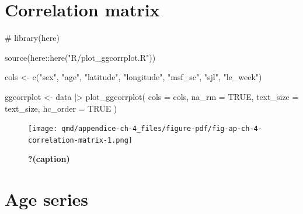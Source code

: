 \documentclass[
  12pt,
  a4paper,
  oneside]{tesesusp}
\newenvironment{Shaded}{\begin{snugshade}}{\end{snugshade}}
\newcommand{\AttributeTok}[1]{\textcolor[rgb]{0.40,0.45,0.13}{#1}}
\newcommand{\CommentTok}[1]{\textcolor[rgb]{0.37,0.37,0.37}{#1}}
\newcommand{\ConstantTok}[1]{\textcolor[rgb]{0.56,0.35,0.01}{#1}}
\newcommand{\FunctionTok}[1]{\textcolor[rgb]{0.28,0.35,0.67}{#1}}
\newcommand{\NormalTok}[1]{\textcolor[rgb]{0.00,0.23,0.31}{#1}}
\newcommand{\OtherTok}[1]{\textcolor[rgb]{0.00,0.23,0.31}{#1}}
\newcommand{\SpecialCharTok}[1]{\textcolor[rgb]{0.37,0.37,0.37}{#1}}
\newcommand{\StringTok}[1]{\textcolor[rgb]{0.13,0.47,0.30}{#1}}
\begin{document}
\hypertarget{correlation-matrix}{%
\section{Correlation matrix}\label{correlation-matrix}}

\begin{Shaded}
\begin{Highlighting}[numbers=left,,]
\CommentTok{\# library(here)}

\FunctionTok{source}\NormalTok{(here}\SpecialCharTok{::}\FunctionTok{here}\NormalTok{(}\StringTok{"R/plot\_ggcorrplot.R"}\NormalTok{))}

\NormalTok{cols }\OtherTok{\textless{}{-}} \FunctionTok{c}\NormalTok{(}\StringTok{"sex"}\NormalTok{, }\StringTok{"age"}\NormalTok{, }\StringTok{"latitude"}\NormalTok{, }\StringTok{"longitude"}\NormalTok{, }\StringTok{"msf\_sc"}\NormalTok{, }\StringTok{"sjl"}\NormalTok{, }\StringTok{"le\_week"}\NormalTok{)}

\NormalTok{ggcorrplot }\OtherTok{\textless{}{-}}
\NormalTok{  data }\SpecialCharTok{|\textgreater{}}
  \FunctionTok{plot\_ggcorrplot}\NormalTok{(}
    \AttributeTok{cols =}\NormalTok{ cols, }
    \AttributeTok{na\_rm =} \ConstantTok{TRUE}\NormalTok{, }
    \AttributeTok{text\_size =}\NormalTok{ text\_size, }
    \AttributeTok{hc\_order =} \ConstantTok{TRUE}
\NormalTok{    )}
\end{Highlighting}
\end{Shaded}

\begin{figure}[H]

\caption{\label{fig-ap-ch-4-correlation-matrix}\textbf{?(caption)}}

{\centering \texttt{[image: qmd/appendice-ch-4\_files/figure-pdf/fig-ap-ch-4-correlation-matrix-1.png]}

}

\end{figure}

\hypertarget{age-series}{%
\section{Age series}\label{age-series}}
\end{document}
